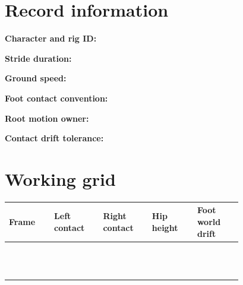 \documentclass[10pt,letterpaper]{article}
\begin{document}
\makedoctitle
\makedocsummary

\section{Record information}
\noindent\textbf{Character and rig ID:}\quad\hrulefill\par\vspace{10pt}
\noindent\textbf{Stride duration:}\quad\hrulefill\par\vspace{10pt}
\noindent\textbf{Ground speed:}\quad\hrulefill\par\vspace{10pt}
\noindent\textbf{Foot contact convention:}\quad\hrulefill\par\vspace{10pt}
\noindent\textbf{Root motion owner:}\quad\hrulefill\par\vspace{10pt}
\noindent\textbf{Contact drift tolerance:}\quad\hrulefill\par\vspace{10pt}\section{Working grid}
\begin{longtable}{|p{0.156\linewidth}|p{0.156\linewidth}|p{0.156\linewidth}|p{0.156\linewidth}|p{0.156\linewidth}|}
\hline
\textbf{Frame} & \textbf{Left contact} & \textbf{Right contact} & \textbf{Hip height} & \textbf{Foot world drift}\\\hline
\endhead
\rule{0pt}{20pt} &  &  &  & \\\hline
\rule{0pt}{20pt} &  &  &  & \\\hline
\rule{0pt}{20pt} &  &  &  & \\\hline
\rule{0pt}{20pt} &  &  &  & \\\hline
\rule{0pt}{20pt} &  &  &  & \\\hline
\rule{0pt}{20pt} &  &  &  & \\\hline
\rule{0pt}{20pt} &  &  &  & \\\hline
\rule{0pt}{20pt} &  &  &  & \\\hline
\rule{0pt}{20pt} &  &  &  & \\\hline
\rule{0pt}{20pt} &  &  &  & \\\hline
\rule{0pt}{20pt} &  &  &  & \\\hline
\rule{0pt}{20pt} &  &  &  & \\\hline
\end{longtable}
\end{document}
